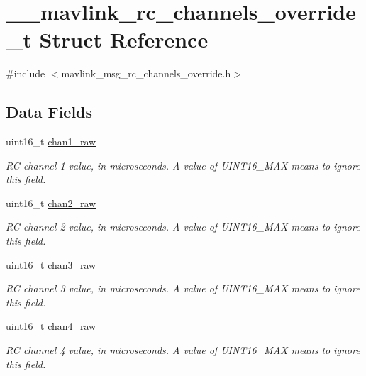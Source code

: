 \hypertarget{struct____mavlink__rc__channels__override__t}{\section{\+\_\+\+\_\+mavlink\+\_\+rc\+\_\+channels\+\_\+override\+\_\+t Struct Reference}
\label{struct____mavlink__rc__channels__override__t}
}


{\ttfamily \#include $<$mavlink\+\_\+msg\+\_\+rc\+\_\+channels\+\_\+override.\+h$>$}

\subsection*{Data Fields}
\begin{DoxyCompactItemize}
\item 
uint16\+\_\+t \hyperlink{struct____mavlink__rc__channels__override__t_aeb8348ef82cccce6d514fdf1d2a4d216}{chan1\+\_\+raw}
\begin{DoxyCompactList}\small\item\em R\+C channel 1 value, in microseconds. A value of U\+I\+N\+T16\+\_\+\+M\+A\+X means to ignore this field. \end{DoxyCompactList}\item 
uint16\+\_\+t \hyperlink{struct____mavlink__rc__channels__override__t_ab3632a873125a666e50f889d854a41d4}{chan2\+\_\+raw}
\begin{DoxyCompactList}\small\item\em R\+C channel 2 value, in microseconds. A value of U\+I\+N\+T16\+\_\+\+M\+A\+X means to ignore this field. \end{DoxyCompactList}\item 
uint16\+\_\+t \hyperlink{struct____mavlink__rc__channels__override__t_aaf6d972bf21b65c73095fc5c45aff71a}{chan3\+\_\+raw}
\begin{DoxyCompactList}\small\item\em R\+C channel 3 value, in microseconds. A value of U\+I\+N\+T16\+\_\+\+M\+A\+X means to ignore this field. \end{DoxyCompactList}\item 
uint16\+\_\+t \hyperlink{struct____mavlink__rc__channels__override__t_afc315c11bfffdd9aa051799c5d2d0fae}{chan4\+\_\+raw}
\begin{DoxyCompactList}\small\item\em R\+C channel 4 value, in microseconds. A value of U\+I\+N\+T16\+\_\+\+M\+A\+X means to ignore this field. \end{DoxyCompactList}\item 

\end{DoxyCompactItemize}
